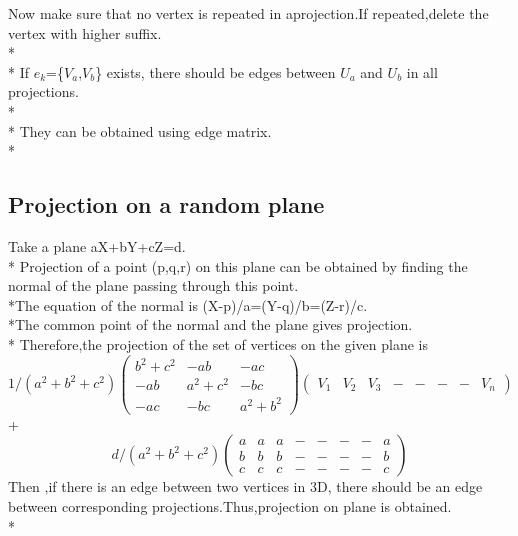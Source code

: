 \documentclass[a4paper]{article}
\begin{document}
Now make sure that no vertex is repeated in aprojection.If repeated,delete the vertex with higher suffix.
\\*\\*
If $e_k$=\{$V_a$,$V_b$\} exists, there should be edges between $U_a$ and $U_b$ in all projections.
\\*\\*
They can be obtained using edge matrix.
\\*
\subsection{Projection on a random plane}
Take a plane aX+bY+cZ=d.
\\*
Projection of a point (p,q,r) on this plane can be obtained by finding the normal of the plane passing through this point.
\\*The equation of the normal is (X-p)/a=(Y-q)/b=(Z-r)/c.
\\*The common point of the normal and the plane gives projection.
\\*
Therefore,the projection of the set of vertices on the given plane is
\[ 1/(a^2+b^2+c^2)\left( \begin{array}{cccccccc}
b^2+c^2&-ab&-ac\\
-ab&a^2+c^2&-bc\\
-ac&-bc&a^2+b^2
\end{array} \right)
%
\left( \begin{array}{cccccccc}
V_1&V_2&V_3&-&-&-&-&V_n
\end{array} \right)\]
+
\[d/(a^2+b^2+c^2)\left( \begin{array}{cccccccc}
a&a&a&-&-&-&-&a\\
b&b&b&-&-&-&-&b\\
c&c&c&-&-&-&-&c
\end{array} \right)\] 
Then ,if there is an edge between two vertices in 3D, there should be an edge between corresponding projections.Thus,projection on plane is obtained.
\\*
\end{document}
